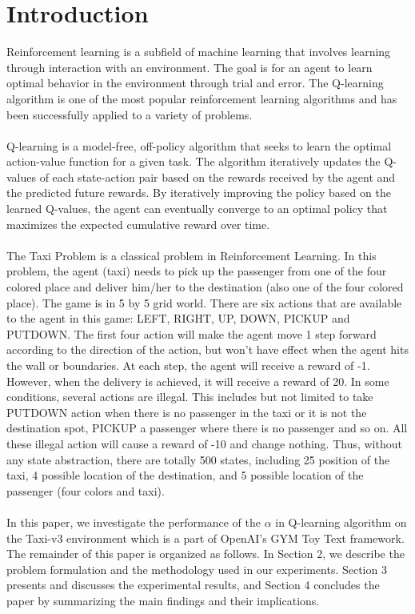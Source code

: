 \documentclass[conference]{IEEEtran}
\begin{document}
\section{Introduction}
Reinforcement learning is a subfield of machine learning that involves learning through interaction with an environment. The goal is for an agent to learn optimal behavior in the environment through trial and error. The Q-learning algorithm is one of the most popular reinforcement learning algorithms and has been successfully applied to a variety of problems. \\ \\ Q-learning \cite{1} is a model-free, off-policy algorithm that seeks to learn the optimal action-value function for a given task. The algorithm iteratively updates the Q-values of each state-action pair based on the rewards received by the agent and the predicted future rewards. By iteratively improving the policy based on the learned Q-values, the agent can eventually converge to an optimal policy that maximizes the expected cumulative reward over time. \\ \\ The Taxi Problem\cite{2} is a classical problem in Reinforcement Learning. In this problem, the agent (taxi) needs to pick up the passenger from one of the four colored place and deliver him/her to the destination (also one of the four colored place). The game is in 5 by 5 grid world. There are six actions that are available to the agent in this game: LEFT, RIGHT, UP, DOWN, PICKUP and PUTDOWN. The first four action will make the agent move 1 step forward according to the direction of the action, but won't have effect when the agent hits the wall or boundaries. At each step, the agent will receive a reward of -1. However, when the delivery is achieved, it will receive a reward of 20. In some conditions, several actions are illegal. This includes but not limited to take PUTDOWN action when there is no passenger in the taxi or it is not the destination spot, PICKUP a passenger where there is no passenger and so on. All these illegal action will cause a reward of -10 and change nothing. Thus, without any state abstraction, there are totally 500 states, including 25 position of the taxi, 4 possible location of the destination, and 5 possible location of the passenger (four colors and taxi). \\ \\ In this paper, we investigate the performance of the $\alpha$ in Q-learning algorithm on the Taxi-v3 environment \cite{3} which is a part of OpenAI's GYM Toy Text framework. The remainder of this paper is organized as follows. In Section 2, we describe the problem formulation and the methodology used in our experiments. Section 3 presents and discusses the experimental results, and Section 4 concludes the paper by summarizing the main findings and their implications.
\end{document}
